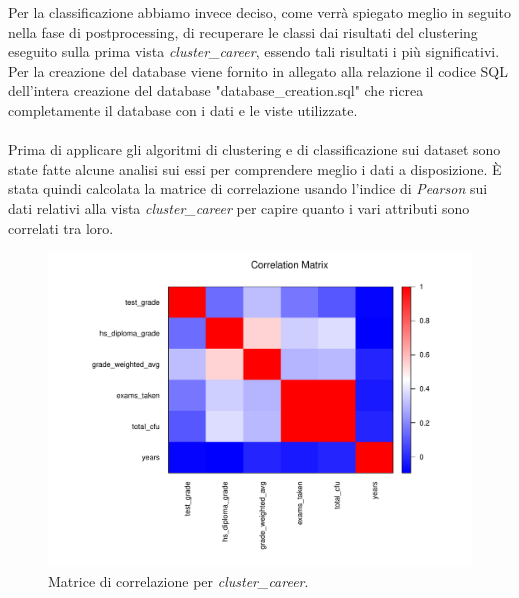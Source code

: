\documentclass[]{article}
\begin{document}
Per la classificazione abbiamo invece deciso, come verr\`{a} spiegato meglio in seguito nella fase di postprocessing, di recuperare le classi dai risultati del clustering eseguito sulla prima vista \textit{cluster\_career}, essendo tali risultati i pi\`{u} significativi.\\
Per la creazione del database viene fornito in allegato alla relazione il codice SQL dell'intera creazione del database "database\_creation.sql" che ricrea completamente il database con i dati e le viste utilizzate.

\paragraph{}
Prima di applicare gli algoritmi di clustering e di classificazione sui dataset sono state fatte alcune analisi sui essi per comprendere meglio i dati a disposizione. \`{E} stata quindi calcolata la matrice di correlazione usando l'indice di \textit{Pearson} sui dati relativi alla vista \textit{cluster\_career} per capire quanto i vari attributi sono correlati tra loro.

\begin{figure}[h]
	\centering
	\includegraphics[scale=0.5]{Img/corr_matrix_career.pdf}
	\caption{Matrice di correlazione per \textit{cluster\_career}.
	\label{fig:1}}
\end{figure} 
\end{document}
